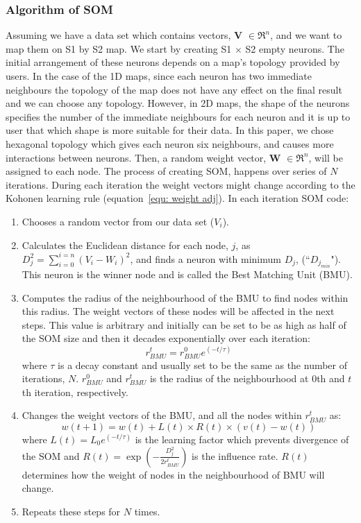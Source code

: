 \documentclass[useAMS,usenatbib]{mn2e}
\newcommand{\boldit}[1]{\textbf{\mathversion{bold}#1}}
\begin{document}
 \subsubsection{Algorithm of SOM} 
 \label{sec: algorithm}
     Assuming we have a data set which contains vectors, \boldit{V} $\in \Re^n$, and we want to map them on S1 by S2 map. 
     We start by creating S1 $\times$ S2 empty neurons. 
     The initial arrangement of these neurons depends on a map's topology provided by users.
     In the case of the 1D maps, since each neuron has two immediate neighbours the topology of the map does not have any effect on the final result and we can choose any topology.
     However, in 2D maps, the shape of the neurons specifies the number of the immediate neighbours for each neuron and it is up to user that which shape is more suitable for their data.
     In this paper, we chose hexagonal topology which gives each neuron six neighbours, and causes more interactions between neurons.
     Then, a random weight vector, \boldit{W} $\in \Re^n$, will be assigned to each node.
     The process of creating SOM, happens over series of $N$ iterations. 
     During each iteration the weight vectors might change according to the Kohonen learning rule (equation~\ref{equ: weight adj}). 
      In each iteration SOM code:
     \begin{enumerate}
        \item Chooses a random vector from our data set ($V_i$).
        \item Calculates the Euclidean distance for each node, $j$, as  $D_j^2= \sum_{i=0}^{i=n} (V_i - W_i)^2$, and finds a neuron with minimum $D_j$, (``$D_{j_{min}}$"). This neuron is the winner node and is called the Best Matching Unit (BMU). 
        \item  Computes the radius of the neighbourhood of the BMU to find nodes within this radius. The weight vectors of these nodes will be affected in the next steps. This value is arbitrary and initially can be set to be as high as half of the SOM size and then it decades exponentially over each iteration:
        \begin{equation}
            r^t_{BMU} = r^0_{BMU}e^{(-t/\tau)}
        \end{equation}
        where $\tau$ is a decay constant and usually set to be the same as the number of iterations, $N$. $r^0_{BMU}$ and $r^t_{BMU}$ is the radius of the neighbourhood at 0th and $t$th iteration, respectively. 
        \item Changes the weight vectors of the BMU, and all the nodes within $r^t_{BMU}$ as:
        \begin{equation}
            \label{equ: weight adj}
            w(t+1)=w(t)+L(t) \times R(t) \times(v(t)-w(t))
        \end{equation}
        where $L(t) = L_0 e^{(-t/\tau)}$ is the learning factor which prevents divergence of the SOM and $R(t)=\exp(-\frac{D_j^2}{2r^t_{BMU}})$ is the influence rate. $R(t)$ determines how the weight of nodes in the neighbourhood of BMU will change.
        \item  Repeats these steps for $N$ times.
     \end{enumerate}
     
\end{document}
